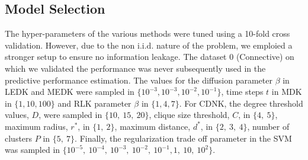 \documentclass[review]{elsarticle}
\begin{document}
\subsection{Model Selection}
The hyper-parameters of the various methods were tuned using a 10-fold cross validation. However, due to the non i.i.d. nature of the problem, we emploied a stronger setup to ensure no information leakage. The dataset $0$ (Connective) on which we  validated the performance was never subsequently used in the predictive performance estimation. The values for the diffusion parameter $\beta$ in LEDK and MEDK were sampled in $\lbrace 10^{-3}, 10^{-3}, 10^{-2}, 10^{-1} \rbrace$, time steps $t$ in MDK in $\lbrace 1, 10, 100 \rbrace$ and RLK parameter $\beta$ in $\lbrace 1, 4, 7 \rbrace$. For CDNK, the degree threshold values, $D$, were sampled in $\lbrace 10,\ 15,\ 20 \rbrace$, clique size threshold, $C$, in $\lbrace 4,\ 5 \rbrace$, maximum radius, $r^*$, in $\lbrace 1,\ 2 \rbrace$, maximum distance, $d^*$, in $\lbrace 2,\ 3,\ 4 \rbrace$, number of clusters $P$ in $\lbrace 5,\ 7 \rbrace$. Finally, the regularization trade off parameter in the SVM was sampled in $\lbrace 10^{-5},  \ 10^{-4}, \ 10^{-3},\ 10^{-2},\ 10^{-1}, 1,\ 10,\ 10^2 \rbrace$.
\end{document}
